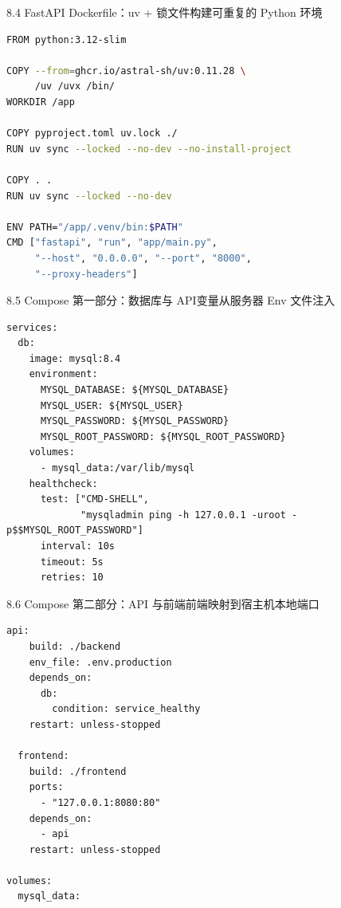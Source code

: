 \begin{frame}[fragile]{8.4 FastAPI Dockerfile：uv + 锁文件}{构建可重复的 Python 环境}
  \begin{lstlisting}[language=bash]
FROM python:3.12-slim

COPY --from=ghcr.io/astral-sh/uv:0.11.28 \
     /uv /uvx /bin/
WORKDIR /app

COPY pyproject.toml uv.lock ./
RUN uv sync --locked --no-dev --no-install-project

COPY . .
RUN uv sync --locked --no-dev

ENV PATH="/app/.venv/bin:$PATH"
CMD ["fastapi", "run", "app/main.py",
     "--host", "0.0.0.0", "--port", "8000",
     "--proxy-headers"]
  \end{lstlisting}
\end{frame}

\begin{frame}[fragile]{8.5 Compose 第一部分：数据库与 API}{变量从服务器 Env 文件注入}
  \begin{lstlisting}
services:
  db:
    image: mysql:8.4
    environment:
      MYSQL_DATABASE: ${MYSQL_DATABASE}
      MYSQL_USER: ${MYSQL_USER}
      MYSQL_PASSWORD: ${MYSQL_PASSWORD}
      MYSQL_ROOT_PASSWORD: ${MYSQL_ROOT_PASSWORD}
    volumes:
      - mysql_data:/var/lib/mysql
    healthcheck:
      test: ["CMD-SHELL",
             "mysqladmin ping -h 127.0.0.1 -uroot -p$$MYSQL_ROOT_PASSWORD"]
      interval: 10s
      timeout: 5s
      retries: 10
  \end{lstlisting}
\end{frame}

\begin{frame}[fragile]{8.6 Compose 第二部分：API 与前端}{前端映射到宿主机本地端口}
  \begin{lstlisting}[basicstyle=\ttfamily\fontsize{5.0}{5.6}\selectfont]
  api:
    build: ./backend
    env_file: .env.production
    depends_on:
      db:
        condition: service_healthy
    restart: unless-stopped

  frontend:
    build: ./frontend
    ports:
      - "127.0.0.1:8080:80"
    depends_on:
      - api
    restart: unless-stopped

volumes:
  mysql_data:
  \end{lstlisting}
\end{frame}

